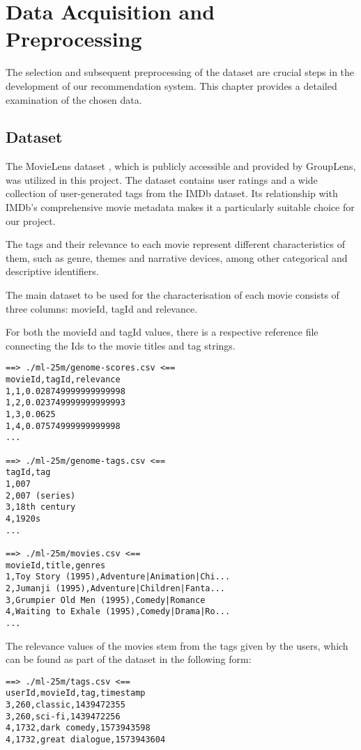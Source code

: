 \section{Data Acquisition and Preprocessing}
The selection and subsequent preprocessing of the dataset are crucial steps in the development of our recommendation system. This chapter provides a detailed examination of the chosen data.

\subsection{Dataset}
The MovieLens dataset , which is publicly accessible and provided by GroupLens, was utilized in this project. The dataset contains user ratings and a wide collection of user-generated tags from the IMDb dataset. Its relationship with IMDb's comprehensive movie metadata makes it a particularly suitable choice for our project. 

The tags and their relevance to each movie represent different characteristics of them, such as genre, themes and narrative devices, among other categorical and descriptive identifiers.

The main dataset to be used for the characterisation of each movie consists of three columns: movieId, tagId and relevance. 

For both the movieId and tagId values, there is a respective reference file connecting the Ids to the movie titles and tag strings.

\begin{verbatim}
==> ./ml-25m/genome-scores.csv <==
movieId,tagId,relevance
1,1,0.028749999999999998
1,2,0.023749999999999993
1,3,0.0625
1,4,0.07574999999999998
...

==> ./ml-25m/genome-tags.csv <==
tagId,tag
1,007
2,007 (series)
3,18th century
4,1920s
...

==> ./ml-25m/movies.csv <==
movieId,title,genres
1,Toy Story (1995),Adventure|Animation|Chi...
2,Jumanji (1995),Adventure|Children|Fanta...
3,Grumpier Old Men (1995),Comedy|Romance
4,Waiting to Exhale (1995),Comedy|Drama|Ro...
...
\end{verbatim}

The relevance values of the movies stem from the tags given by the users, which can be found as part of the dataset in the following form:

\begin{verbatim}
==> ./ml-25m/tags.csv <==
userId,movieId,tag,timestamp
3,260,classic,1439472355
3,260,sci-fi,1439472256
4,1732,dark comedy,1573943598
4,1732,great dialogue,1573943604
\end{verbatim}

